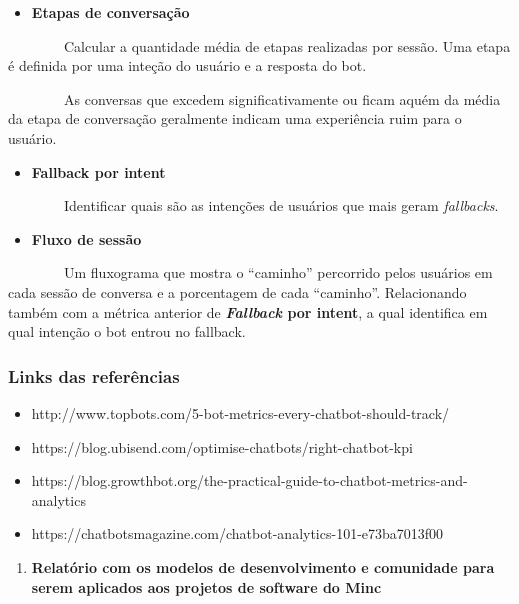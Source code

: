 \begin{itemize}
\tightlist
\item
  \textbf{Etapas de conversação}
\end{itemize}

    Calcular a quantidade média de etapas realizadas por sessão. Uma
etapa é definida por uma inteção do usuário e a resposta do bot.

    As conversas que excedem significativamente ou ficam aquém da média
da etapa de conversação geralmente indicam uma experiência ruim para o
usuário.

\begin{itemize}
\tightlist
\item
  \textbf{Fallback por intent}
\end{itemize}

    Identificar quais são as intenções de usuários que mais geram
\emph{fallbacks}.

\begin{itemize}
\tightlist
\item
  \textbf{Fluxo de sessão}
\end{itemize}

    Um fluxograma que mostra o ``caminho'' percorrido pelos usuários em
cada sessão de conversa e a porcentagem de cada ``caminho''.
Relacionando também com a métrica anterior de \textbf{\emph{Fallback}
por intent}, a qual identifica em qual intenção o bot entrou no
fallback.

\hypertarget{links-das-referuxeancias}{%
\subsubsection{Links das referências}\label{links-das-referuxeancias}}

\begin{itemize}
\tightlist
\item
  http://www.topbots.com/5-bot-metrics-every-chatbot-should-track/
\item
  https://blog.ubisend.com/optimise-chatbots/right-chatbot-kpi
\item
  https://blog.growthbot.org/the-practical-guide-to-chatbot-metrics-and-analytics
\item
  https://chatbotsmagazine.com/chatbot-analytics-101-e73ba7013f00
\end{itemize}

\begin{enumerate}
\def\labelenumi{\arabic{enumi}.}
\setcounter{enumi}{2}
\tightlist
\item
  \textbf{Relatório com os modelos de desenvolvimento e comunidade para
  serem aplicados aos projetos de software do Minc}
\end{enumerate}

